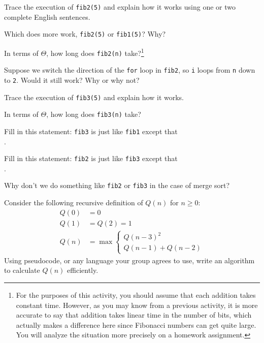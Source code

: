 \documentclass{tufte-handout}
\begin{document}
\begin{questions}
\item Trace the execution of \verb|fib2(5)| and explain how it works
  using one or two complete English sentences. \vspace{1in}
\item Which does more work, \verb|fib2(5)| or \verb|fib1(5)|?  Why?
\item In terms of $\Theta$, how long does \verb|fib2(n)|
  take?\footnote{For the purposes of this activity, you should assume
    that each addition takes constant time.  However, as you may know from
    a previous activity, it is more accurate to say that addition
    takes linear time in the number of bits, which actually makes a
    difference here since Fibonacci numbers can get quite large.  You
    will analyze the situation more precisely on a homework assignment.}
\item Suppose we switch the direction of the \verb|for| loop in
  \verb|fib2|, so \verb|i| loops from \verb|n| down to \verb|2|.
  Would it still work?  Why or why not?
\item Trace the execution of \verb|fib3(5)| and explain how it works. \vspace{1in}
\item In terms of $\Theta$, how long does \verb|fib3(n)| take?
\item Fill in this statement: \verb|fib3| is just like \verb|fib1|
  except that \\ \blank.
\item Fill in this statement: \verb|fib2| is just like \verb|fib3|
  except that \\ \blank.
\item Why don't we do something like \verb|fib2| or \verb|fib3| in the
  case of merge sort?
\item Consider the following recursive definition of $Q(n)$ for $n
  \geq 0$:
  \begin{align*}
    Q(0) &= 0 \\
    Q(1) &= Q(2) = 1 \\
    Q(n) &= \max \begin{cases} Q(n - 3)^2 \\ Q(n-1) + Q(n-2) \end{cases}
  \end{align*}
  Using pseudocode, or any language your group agrees to use, write an
  algorithm to calculate $Q(n)$ efficiently.
\end{questions}
\end{document}
